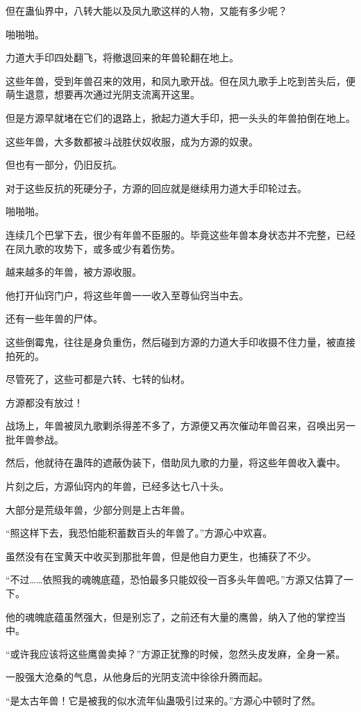 \begin{this_body}
但在蛊仙界中，八转大能以及凤九歌这样的人物，又能有多少呢？

啪啪啪。

力道大手印四处翻飞，将撤退回来的年兽轮翻在地上。

这些年兽，受到年兽召来的效用，和凤九歌开战。但在凤九歌手上吃到苦头后，便萌生退意，想要再次通过光阴支流离开这里。

但是方源早就堵在它们的退路上，掀起力道大手印，把一头头的年兽拍倒在地上。

这些年兽，大多数都被斗战胜伏奴收服，成为方源的奴隶。

但也有一部分，仍旧反抗。

对于这些反抗的死硬分子，方源的回应就是继续用力道大手印轮过去。

啪啪啪。

连续几个巴掌下去，很少有年兽不臣服的。毕竟这些年兽本身状态并不完整，已经在凤九歌的攻势下，或多或少有着伤势。

越来越多的年兽，被方源收服。

他打开仙窍门户，将这些年兽一一收入至尊仙窍当中去。

还有一些年兽的尸体。

这些倒霉鬼，往往是身负重伤，然后碰到方源的力道大手印收摄不住力量，被直接拍死的。

尽管死了，这些可都是六转、七转的仙材。

方源都没有放过！

战场上，年兽被凤九歌剿杀得差不多了，方源便又再次催动年兽召来，召唤出另一批年兽参战。

然后，他就待在蛊阵的遮蔽伪装下，借助凤九歌的力量，将这些年兽收入囊中。

片刻之后，方源仙窍内的年兽，已经多达七八十头。

大部分是荒级年兽，少部分则是上古年兽。

“照这样下去，我恐怕能积蓄数百头的年兽了。”方源心中欢喜。

虽然没有在宝黄天中收买到那批年兽，但是他自力更生，也捕获了不少。

“不过……依照我的魂魄底蕴，恐怕最多只能奴役一百多头年兽吧。”方源又估算了一下。

他的魂魄底蕴虽然强大，但是别忘了，之前还有大量的鹰兽，纳入了他的掌控当中。

“或许我应该将这些鹰兽卖掉？”方源正犹豫的时候，忽然头皮发麻，全身一紧。

一股强大沧桑的气息，从他身后的光阴支流中徐徐升腾而起。

“是太古年兽！它是被我的似水流年仙蛊吸引过来的。”方源心中顿时了然。


\end{this_body}
